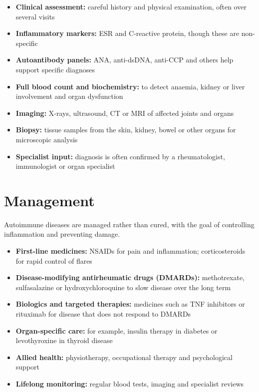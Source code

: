\begin{itemize}
    \item \textbf{Clinical assessment:} careful history and physical examination, often over several visits
    \item \textbf{Inflammatory markers:} ESR and C-reactive protein, though these are non-specific
    \item \textbf{Autoantibody panels:} ANA, anti-dsDNA, anti-CCP and others help support specific diagnoses
    \item \textbf{Full blood count and biochemistry:} to detect anaemia, kidney or liver involvement and organ dysfunction
    \item \textbf{Imaging:} X-rays, ultrasound, CT or MRI of affected joints and organs
    \item \textbf{Biopsy:} tissue samples from the skin, kidney, bowel or other organs for microscopic analysis
    \item \textbf{Specialist input:} diagnosis is often confirmed by a rheumatologist, immunologist or organ specialist
\end{itemize}

\section*{Management}
Autoimmune diseases are managed rather than cured, with the goal of controlling inflammation and preventing damage.

\begin{itemize}
    \item \textbf{First-line medicines:} NSAIDs for pain and inflammation; corticosteroids for rapid control of flares
    \item \textbf{Disease-modifying antirheumatic drugs (DMARDs):} methotrexate, sulfasalazine or hydroxychloroquine to slow disease over the long term
    \item \textbf{Biologics and targeted therapies:} medicines such as TNF inhibitors or rituximab for disease that does not respond to DMARDs
    \item \textbf{Organ-specific care:} for example, insulin therapy in diabetes or levothyroxine in thyroid disease
    \item \textbf{Allied health:} physiotherapy, occupational therapy and psychological support
    \item \textbf{Lifelong monitoring:} regular blood tests, imaging and specialist reviews
\end{itemize}

